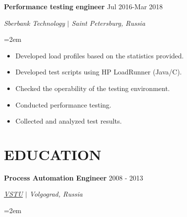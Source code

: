 \documentclass{article}
\newcommand{\NewPart}[1]{\section*{{\color{gray}\uppercase{#1}}}}
\newcommand{\ExperienceEntry}[4]{
		\noindent \textbf{#1} \hfill  
		\hfill #2 \par  %
		\noindent \textit{#3} \par        %
		\noindent\hangindent=2em\hangafter=0 \small #4 %
		\normalsize \par}
\begin{document}
\ExperienceEntry
{Performance testing engineer}
{Jul 2016-Mar 2018}
{Sberbank Technology $\vert$ Saint Petersburg, Russia}
{	
\begin{itemize}
	\item{Developed load profiles based on the statistics provided.}
	\item{Developed test scripts using HP LoadRunner (Java/C).}
	\item{Checked the operability of the testing environment.}
	\item{Conducted performance testing.}
	\item{Collected and analyzed test results.}
\end{itemize}
}


\NewPart{Education}{}

\ExperienceEntry
{Process Automation Engineer}
{2008 - 2013}
{\href{http://vstu.ru}
{VSTU} $\vert$ Volgograd, Russia}
{}
\end{document}
